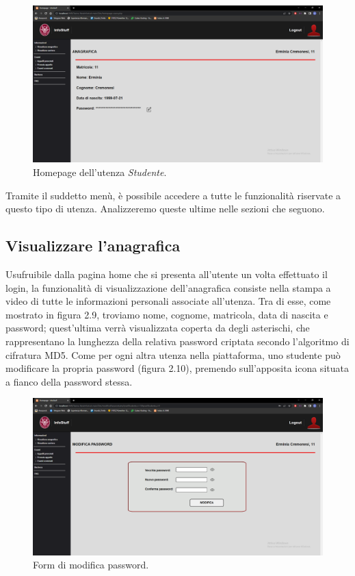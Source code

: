 \documentclass [a4paper,11pt]{book}
\begin{document}
\begin{figure}
\centering
\includegraphics[scale=0.3]{figura2-9.png}
\caption{Homepage dell'utenza \emph{Studente}.}
\end{figure}

Tramite il suddetto menù, è possibile accedere a tutte le funzionalità riservate a questo tipo di utenza. Analizzeremo queste ultime nelle sezioni che seguono.

\medskip

\subsection{Visualizzare l'anagrafica}

Usufruibile dalla pagina home che si presenta all'utente un volta effettuato il login, la funzionalità di visualizzazione dell'anagrafica consiste nella stampa a video di tutte le informazioni personali associate all'utenza. Tra di esse, come mostrato in figura 2.9, troviamo nome, cognome, matricola, data di nascita e password; quest'ultima verrà visualizzata coperta da degli asterischi, che rappresentano la lunghezza della relativa password criptata secondo l'algoritmo di cifratura MD5. Come per ogni altra utenza nella piattaforma, uno studente può modificare la propria password (figura 2.10), premendo sull'apposita icona situata a fianco della password stessa.

\begin{figure}
\centering
\includegraphics[scale=0.3]{figura2-10.png}
\caption{Form di modifica password.}
\end{figure}
\end{document}
